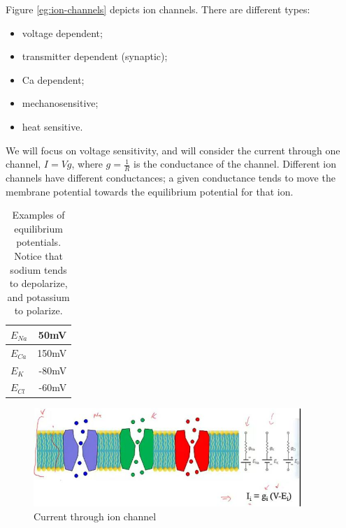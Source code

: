 \documentclass[]{article}
\begin{document}
Figure \ref{eg:ion-channels} depicts ion channels. There are different types: \begin{itemize}
	\item voltage dependent; 
	\item transmitter dependent (synaptic); 
	\item Ca dependent; 
	\item mechanosensitive;
	\item heat sensitive.
\end{itemize}
We will focus on voltage sensitivity, and will consider the current through one channel, $I=Vg$, where $g=\frac{1}{R}$ is the conductance of the channel. Different ion channels have different conductances; a given conductance tends to move the membrane potential towards the equilibrium potential for that ion.
\begin{table}[H]
	\begin{center}
		\caption[Examples of equilibrium potentials]{Examples of equilibrium potentials. Notice that sodium tends to depolarize, and potassium to polarize.}
		\begin{tabular}{|l|r|} \hline
			$E_{Na}$&50mV \\ \hline
			$E_{Ca}$&150mV \\ \hline
			$E_{K}$&-80mV \\ \hline
			$E_{Cl}$&-60mV \\ \hline
		\end{tabular}
	\end{center}
\end{table}

\begin{figure}[H]
	\caption[Current through ion channel]{Current through ion channel}
	\includegraphics[width=0.9\textwidth]{ion-channels3}
\end{figure}
\end{document}
